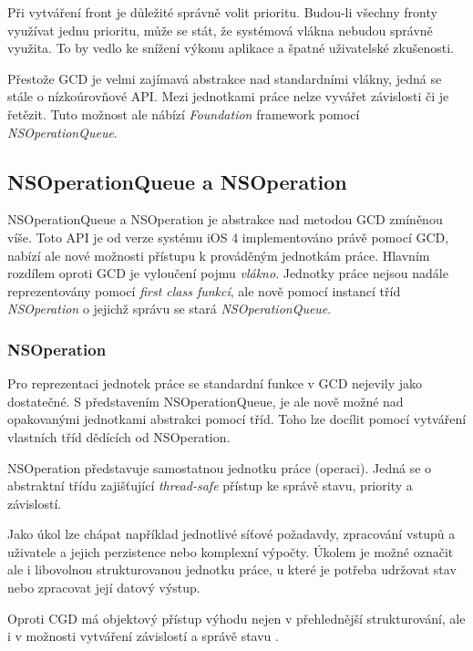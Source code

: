 Při vytváření front je důležité správně volit prioritu.
Budou-li všechny fronty využívat jednu prioritu, může se stát, že systémová vlákna nebudou správně využita.
To by vedlo ke snížení výkonu aplikace a špatné uživatelské zkušenosti.

Přestože GCD je velmi zajímavá abstrakce nad standardními vlákny, jedná se stále o nízkoúrovňové API.
Mezi jednotkami práce nelze vyvářet závislosti či je řetězit.
Tuto možnost ale nábízí \textit{Foundation} framework pomocí \textit{NSOperationQueue}.

\subsection{NSOperationQueue a NSOperation}

NSOperationQueue a NSOperation je abstrakce nad metodou GCD zmíněnou víše.
Toto API je od verze systému iOS 4 implementováno právě pomocí GCD, nabízí ale nové možnosti přístupu k prováděným jednotkám práce.
Hlavním rozdílem oproti GCD je vyloučení pojmu \textit{vlákno}.
Jednotky práce nejsou nadále reprezentovány pomocí \textit{first class funkcí}, ale nově pomocí instancí tříd \textit{NSOperation} o jejichž správu se stará \textit{NSOperationQueue}. \cite{cocoacasts-nsoperation-vs-gcd}

\subsubsection*{NSOperation}

Pro reprezentaci jednotek práce se standardní funkce v GCD nejevily jako dostatečné.
S představením NSOperationQueue, je ale nově možné nad opakovanými jednotkami abstrakci pomocí tříd.
Toho lze docílit pomocí vytváření vlastních tříd dědících od NSOperation.

NSOperation představuje samostatnou jednotku práce (operaci).
Jedná se o abstraktní třídu zajišťující \textit{thread-safe} přístup ke správě stavu, priority a závislostí.

Jako úkol lze chápat například jednotlivé síťové požadavdy, zpracování vstupů a uživatele a jejich perzistence nebo komplexní výpočty.
Úkolem je možné označit ale i libovolnou strukturovanou jednotku práce, u které je potřeba udržovat stav nebo zpracovat její datový výstup.

Oproti CGD má objektový přístup výhodu nejen v přehlednější strukturování, ale i v možnosti vytváření závislostí a správě stavu \cite{apple-operation-queues}.

